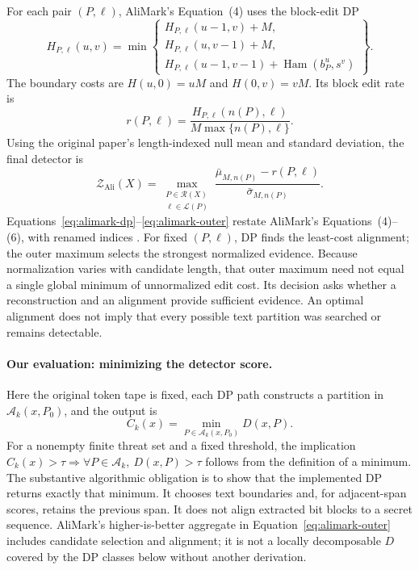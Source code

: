 \documentclass[10pt]{article}
\begin{document}
For each pair $(P,\ell)$, AliMark's Equation~(4) uses the block-edit DP
\begin{equation}
H_{P,\ell}(u,v)=\min\left\{
\begin{array}{l}
H_{P,\ell}(u-1,v)+M,\\
H_{P,\ell}(u,v-1)+M,\\
H_{P,\ell}(u-1,v-1)+\operatorname{Ham}(b_P^u,s^v)
\end{array}\right\}.
\label{eq:alimark-dp}
\end{equation}
The boundary costs are $H(u,0)=uM$ and $H(0,v)=vM$. Its block edit rate is
\begin{equation}
r(P,\ell)=\frac{H_{P,\ell}(n(P),\ell)}
                   {M\max\{n(P),\ell\}}.
\end{equation}
Using the original paper's length-indexed null mean and standard deviation,
the final detector is
\begin{equation}
\mathcal Z_{\mathrm{Ali}}(X)=
\max_{\substack{P\in\mathcal R(X)\\ \ell\in\mathcal L(P)}}
\frac{\bar\mu_{M,n(P)}-r(P,\ell)}{\bar\sigma_{M,n(P)}}.
\label{eq:alimark-outer}
\end{equation}
Equations~\ref{eq:alimark-dp}--\ref{eq:alimark-outer} restate AliMark's
Equations~(4)--(6), with renamed indices \citep{li2026alimark}. For fixed
$(P,\ell)$, DP finds the least-cost alignment; the outer maximum selects the
strongest normalized evidence. Because normalization varies with candidate
length, that outer maximum need not equal a single global minimum of
unnormalized edit cost. Its decision asks whether a reconstruction and an
alignment provide sufficient evidence. An optimal alignment does not imply
that every possible text partition was searched or remains detectable.

\paragraph{Our evaluation: minimizing the detector score.}
Here the original token tape is fixed, each DP path constructs a partition
in $\mathcal A_k(x,P_0)$, and the output is
\begin{equation}
C_k(x)=\min_{P\in\mathcal A_k(x,P_0)}D(x,P).
\label{eq:objective-min}
\end{equation}
For a nonempty finite threat set and a fixed threshold, the implication
$C_k(x)>\tau \Rightarrow \forall P\in\mathcal A_k,\ D(x,P)>\tau$
follows from the definition of a minimum. The substantive algorithmic
obligation is to show that the implemented DP returns exactly that minimum.
It chooses text boundaries and, for adjacent-span scores, retains the
previous span. It does not align extracted bit blocks to a secret sequence.
AliMark's higher-is-better aggregate in Equation~\ref{eq:alimark-outer}
includes candidate selection and alignment; it is not a locally
decomposable $D$ covered by the DP classes below without another derivation.
\end{document}
